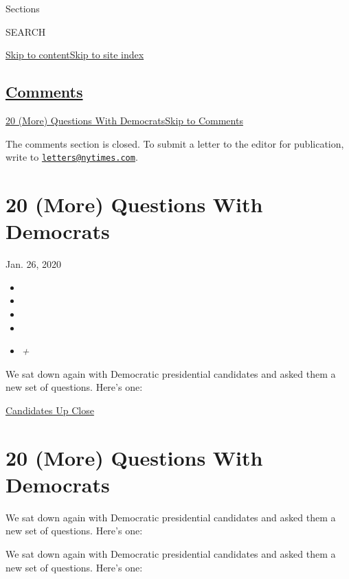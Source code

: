 Sections

SEARCH

\protect\hyperlink{site-content}{Skip to
content}\protect\hyperlink{site-index}{Skip to site index}

\hypertarget{comments}{%
\subsection{\texorpdfstring{\protect\hyperlink{commentsContainer}{Comments}}{Comments}}\label{comments}}

\href{}{20 (More) Questions With Democrats}\href{}{Skip to Comments}

The comments section is closed. To submit a letter to the editor for
publication, write to
\href{mailto:letters@nytimes.com}{\nolinkurl{letters@nytimes.com}}.

\hypertarget{20-more-questions-with-democrats}{%
\section{20 (More) Questions With
Democrats}\label{20-more-questions-with-democrats}}

Jan. 26, 2020

\begin{itemize}
\item
\item
\item
\item
\item
  \emph{+}
\end{itemize}

We sat down again with Democratic presidential candidates and asked them
a new set of questions. Here's one:

\href{https://www.nytimes.com/interactive/2020/us/politics/democratic-candidates-20-questions.html}{Candidates
Up Close}

\hypertarget{20-more-questions-with-democrats-1}{%
\section{20 (More) Questions With
Democrats}\label{20-more-questions-with-democrats-1}}

We sat down again with Democratic presidential candidates and asked them
a new set of questions. Here's one:

We sat down again with Democratic presidential candidates and asked them
a new set of questions. Here's one:

